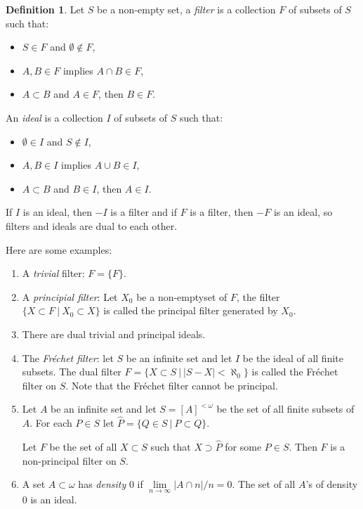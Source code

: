 \documentclass[8pt]{article}
\theoremstyle{definition}
\newtheorem{definition}{Definition}[section]
\theoremstyle{definition}
\theoremstyle{definition}
\theoremstyle{definition}
\theoremstyle{definition}
\theoremstyle{definition}
\theoremstyle{definition}
\theoremstyle{definition}
\theoremstyle{definition}
\theoremstyle{definition}
\theoremstyle{definition}
\theoremstyle{definition}
\theoremstyle{definition}
\theoremstyle{definition}
\theoremstyle{question}
\begin{document}
\begin{definition}
Let $S$ be a non-empty set, a \emph{filter} is a collection $F$ of subsets of $S$ such that:
\begin{itemize}
  \item $S \in F$ and $\emptyset \notin F$,
  \item $A, B \in F$ implies $A \cap B \in F$,
  \item $A \subset B$ and $A \in F$, then $B \in F$. 
\end{itemize}

An \emph{ideal} is a collection $I$ of subsets of $S$ such that:
\begin{itemize}
  \item $\emptyset \in I$ and $S \notin I$,
  \item $A, B \in I$ implies $A \cup B \in I$,
  \item $A \subset B$ and $B \in I$, then $A \in I$.
\end{itemize}
If $I$ is an ideal, then $- I$ is a filter and if $F$ is a filter, then $- F$ is an ideal, so filters and ideals are
dual to each other.
\end{definition}

Here are some examples:
\begin{enumerate}
  \item A \emph{trivial} filter: $F = \{F \}$.
  \item A \emph{principial filter}: Let $X_0$ be a non-emptyset of $F$, the filter
  $\{ X \subset F \: | \: X_0 \subset X \}$ is called the principal filter generated by $X_0$.
  \item There are dual trivial and principal ideals.
  \item The \emph{Fr\'{e}chet filter}: let $S$ be an infinite set and let $I$ be the ideal of all finite subsets. The
  dual filter $F = \{ X \subset S \: | \: |S - X| < \aleph_0 \}$ is called the Fr\'{e}chet filter on $S$.
  Note that the Fr\'{e}chet filter cannot be principal.
  \item Let $A$ be an infinite set and let $S = [A]^{< \omega}$ be the set of all finite subsets of $A$.
  For each $P \in S$ let $\hat{P} = \{ Q \in S \: | \: P \subset Q \}$.

  Let $F$ be the set of all $X \subset S$ such that $X \supset \hat{P}$ for some $P \in S$. 
  Then $F$ is a non-principal filter on $S$.
  \item A set $A \subset \omega$ has \emph{density} $0$ if $\lim \limits_{n \to \infty} |A \cap n| / n = 0$.
  The set of all $A$'s of density $0$ is an ideal.
\end{enumerate}
\end{document}
